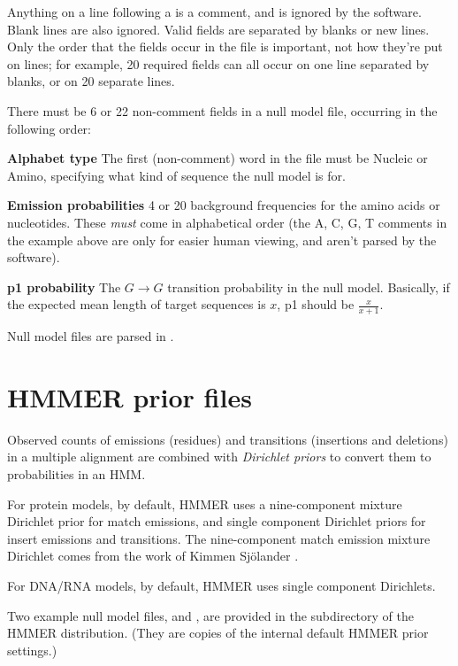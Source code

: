 Anything on a line following a \prog{\#} is a comment, and is ignored
by the software. Blank lines are also ignored. Valid fields are
separated by blanks or new lines. Only the order that the fields occur
in the file is important, not how they're put on lines; for example,
20 required fields can all occur on one line separated by blanks, or
on 20 separate lines. 

There must be 6 or 22 non-comment fields in a null model file,
occurring in the following order:

\begin{wideitem}
\item [\textbf{Alphabet type}] The first (non-comment) word in the
file must be Nucleic or Amino, specifying what kind of sequence the
null model is for.

\item [\textbf{Emission probabilities}] 4 or 20 background
frequencies for the amino acids or nucleotides. These \textit{must}
come in alphabetical order (the A, C, G, T comments in the example
above are only for easier human viewing, and aren't parsed by the
software).

\item [\textbf{p1 probability}] The $G \rightarrow G$ transition
probability in the null model. Basically, if the expected mean length
of target sequences is $x$, p1 should be $\frac{x}{x+1}$.
\end{wideitem}

Null model files are parsed in .

\section {HMMER prior files}

Observed counts of emissions (residues) and transitions (insertions
and deletions) in a multiple alignment are combined with
\textit{Dirichlet priors} to convert them to probabilities
in an HMM. 

For protein models, by default, HMMER uses a nine-component mixture
Dirichlet prior for match emissions, and single component Dirichlet
priors for insert emissions and transitions. The nine-component match
emission mixture Dirichlet comes from the work of Kimmen Sj\"{o}lander
\cite{Sjolander96}.

For DNA/RNA models, by default, HMMER uses single component
Dirichlets.

Two example null model files,
 and , are provided
in the  subdirectory of the HMMER distribution. (They are
copies of the internal default HMMER prior settings.)

